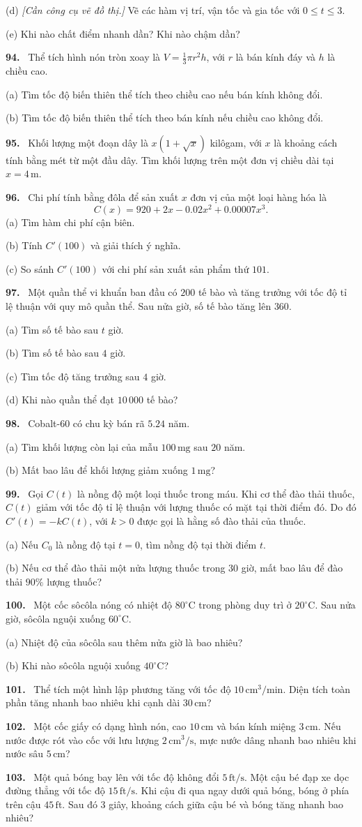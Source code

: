 \documentclass[12pt,a4paper]{article}
\newcommand{\bt}[1]{\par\smallskip\Needspace{5\baselineskip}\noindent\textbf{#1.}\ }
\begin{document}
(d) \textit{[Cần công cụ vẽ đồ thị.]} Vẽ các hàm vị trí, vận tốc và gia tốc với $0\le t\le3$.

(e) Khi nào chất điểm nhanh dần? Khi nào chậm dần?
\bt{94} Thể tích hình nón tròn xoay là $V=\tfrac13\pi r^2h$, với $r$ là bán kính đáy và $h$ là chiều cao.

(a) Tìm tốc độ biến thiên thể tích theo chiều cao nếu bán kính không đổi.

(b) Tìm tốc độ biến thiên thể tích theo bán kính nếu chiều cao không đổi.
\bt{95} Khối lượng một đoạn dây là $x(1+\sqrt{x})$ kilôgam, với $x$ là khoảng cách tính bằng mét từ một đầu dây. Tìm khối lượng trên một đơn vị chiều dài tại $x=4\,\mathrm m$.
\bt{96} Chi phí tính bằng đôla để sản xuất $x$ đơn vị của một loại hàng hóa là
\[C(x)=920+2x-0.02x^2+0.00007x^3.\]
(a) Tìm hàm chi phí cận biên.

(b) Tính $C'(100)$ và giải thích ý nghĩa.

(c) So sánh $C'(100)$ với chi phí sản xuất sản phẩm thứ $101$.
\bt{97} Một quần thể vi khuẩn ban đầu có $200$ tế bào và tăng trưởng với tốc độ tỉ lệ thuận với quy mô quần thể. Sau nửa giờ, số tế bào tăng lên $360$.

(a) Tìm số tế bào sau $t$ giờ.

(b) Tìm số tế bào sau $4$ giờ.

(c) Tìm tốc độ tăng trưởng sau $4$ giờ.

(d) Khi nào quần thể đạt $10\,000$ tế bào?
\bt{98} Cobalt-60 có chu kỳ bán rã $5.24$ năm.

(a) Tìm khối lượng còn lại của mẫu $100\,\mathrm{mg}$ sau $20$ năm.

(b) Mất bao lâu để khối lượng giảm xuống $1\,\mathrm{mg}$?
\bt{99} Gọi $C(t)$ là nồng độ một loại thuốc trong máu. Khi cơ thể đào thải thuốc, $C(t)$ giảm với tốc độ tỉ lệ thuận với lượng thuốc có mặt tại thời điểm đó. Do đó $C'(t)=-kC(t)$, với $k>0$ được gọi là hằng số đào thải của thuốc.

(a) Nếu $C_0$ là nồng độ tại $t=0$, tìm nồng độ tại thời điểm $t$.

(b) Nếu cơ thể đào thải một nửa lượng thuốc trong $30$ giờ, mất bao lâu để đào thải $90\%$ lượng thuốc?
\bt{100} Một cốc sôcôla nóng có nhiệt độ $80^\circ\mathrm C$ trong phòng duy trì ở $20^\circ\mathrm C$. Sau nửa giờ, sôcôla nguội xuống $60^\circ\mathrm C$.

(a) Nhiệt độ của sôcôla sau thêm nửa giờ là bao nhiêu?

(b) Khi nào sôcôla nguội xuống $40^\circ\mathrm C$?
\bt{101} Thể tích một hình lập phương tăng với tốc độ $10\,\mathrm{cm^3/min}$. Diện tích toàn phần tăng nhanh bao nhiêu khi cạnh dài $30\,\mathrm{cm}$?
\bt{102} Một cốc giấy có dạng hình nón, cao $10\,\mathrm{cm}$ và bán kính miệng $3\,\mathrm{cm}$. Nếu nước được rót vào cốc với lưu lượng $2\,\mathrm{cm^3/s}$, mực nước dâng nhanh bao nhiêu khi nước sâu $5\,\mathrm{cm}$?
\bt{103} Một quả bóng bay lên với tốc độ không đổi $5\,\mathrm{ft/s}$. Một cậu bé đạp xe dọc đường thẳng với tốc độ $15\,\mathrm{ft/s}$. Khi cậu đi qua ngay dưới quả bóng, bóng ở phía trên cậu $45\,\mathrm{ft}$. Sau đó $3$ giây, khoảng cách giữa cậu bé và bóng tăng nhanh bao nhiêu?
\end{document}
